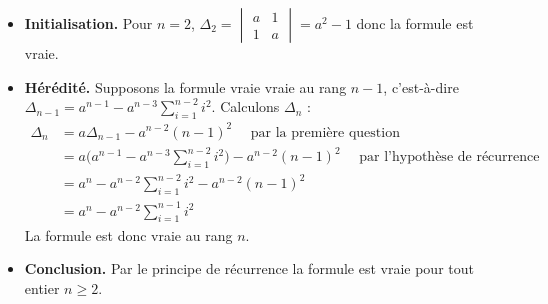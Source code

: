 {\begin{enumerate}
{\begin{itemize}
\item \textbf{Initialisation.} Pour $n=2$,
$\Delta_2=\begin{vmatrix}a&1\\1&a\end{vmatrix}=a^2-1$
donc la formule est vraie.
\item \textbf{Hérédité.} Supposons la formule vraie vraie au rang $n-1$,
c'est-à-dire $\Delta_{n-1}=a^{n-1}-a^{n-3}\sum_{i=1}^{n-2}{i^2}$.
Calculons $\Delta_n$ :
\begin{align*}
\Delta_n 
  & = a \Delta_{n-1} - a^{n-2}(n-1)^2  \quad \text{ par la première question } \\
  & = a\Big(a^{n-1}-a^{n-3}\sum_{i=1}^{n-2}{i^2} \Big) - a^{n-2}(n-1)^2 \quad \text{ par l'hypothèse de récurrence} \\
  & = a^n -  a^{n-2}\sum_{i=1}^{n-2}{i^2} - a^{n-2}(n-1)^2 \\
  & = a^n-a^{n-2}\sum_{i=1}^{n-1}{i^2}
\end{align*}
La formule est donc vraie au rang $n$.
\item \textbf{Conclusion.} Par le principe de récurrence la formule est vraie
pour tout entier $n\ge 2$.
\end{itemize}
}
\end{enumerate}
}
